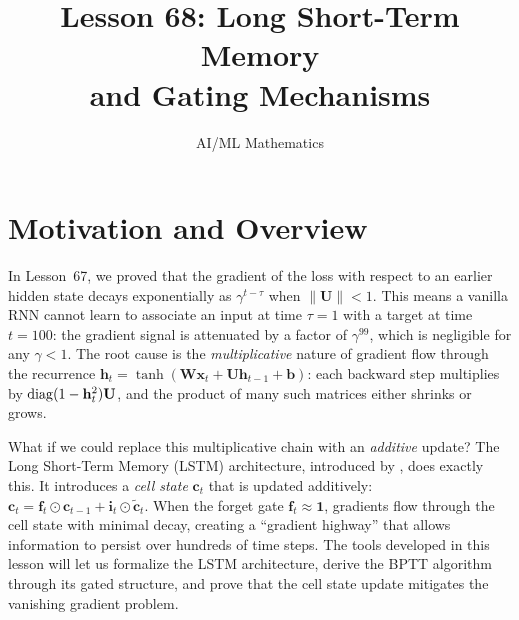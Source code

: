 \documentclass[11pt,a4paper]{article}
\title{Lesson 68: Long Short-Term Memory\\and Gating Mechanisms}
\author{AI/ML Mathematics}
\date{}
\begin{document}
\maketitle
\tableofcontents
\newpage

\section{Motivation and Overview}
\label{sec:motivation}

In Lesson~67, we proved that the gradient of the loss with respect to
an earlier hidden state decays exponentially as $\gamma^{t-\tau}$ when
$\|\mathbf{U}\| < 1$.  This means a vanilla RNN cannot learn to
associate an input at time $\tau = 1$ with a target at time $t = 100$:
the gradient signal is attenuated by a factor of $\gamma^{99}$, which
is negligible for any $\gamma < 1$.  The root cause is the
\emph{multiplicative} nature of gradient flow through the recurrence
$\mathbf{h}_t = \tanh(\mathbf{W}\mathbf{x}_t +
\mathbf{U}\mathbf{h}_{t-1} + \mathbf{b})$: each backward step
multiplies by $\operatorname{diag}(1 - \mathbf{h}_t^2)\mathbf{U}$, and the product
of many such matrices either shrinks or grows.

What if we could replace this multiplicative chain with an
\emph{additive} update?  The Long Short-Term Memory (LSTM)
architecture, introduced by \citet{hochreiter1997}, does exactly this.
It introduces a \emph{cell state} $\mathbf{c}_t$ that is updated
additively: $\mathbf{c}_t = \mathbf{f}_t \odot \mathbf{c}_{t-1} +
\mathbf{i}_t \odot \tilde{\mathbf{c}}_t$.  When the forget gate
$\mathbf{f}_t \approx \mathbf{1}$, gradients flow through the cell
state with minimal decay, creating a ``gradient highway'' that allows
information to persist over hundreds of time steps.  The tools
developed in this lesson will let us formalize the LSTM architecture,
derive the BPTT algorithm through its gated structure, and prove that
the cell state update mitigates the vanishing gradient problem.
\end{document}

